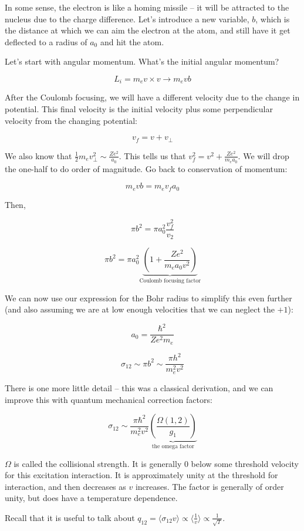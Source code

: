 \documentclass{article}
\def\sigot{\sigma_{12}}
\def\sigot{\sigma_{12}}
\begin{document}
In some sense, the electron is like a homing missile -- it will be attracted to the nucleus due to the charge difference. Let's introduce a new variable, $b$, which is the distance at which we can aim the electron at the atom, and still have it get deflected to a radius of $a_0$ and hit the atom. 

Let's start with angular momentum. What's the initial angular momentum? 

$$
L_i = m_e v\times v \rightarrow m_e  v b
$$

After the Coulomb focusing, we will have a different velocity due to the change in potential. This final velocity is the initial velocity plus some perpendicular velocity from the changing potential:

$$
v_f = v + v_\perp
$$

We also know that $\frac12 m_e v_\perp^2 \sim \frac{Ze^2}{a_0}$. This tells us that $v_f^2 = v^2 + \frac{Ze^2}{m_e a_0}$. We will drop the one-half to do order of magnitude. Go back to conservation of momentum:

$$
m_e v b = m_e v_f a_0 
$$

Then, 

$$
\pi b^2 = \pi a_0^2 \frac{v_f^2}{v_2}
$$

$$
\pi b^2 = \pi a_0^2 \underbrace{\left(1 + \frac{Z e^2}{m_e a_0 v^2}\right)}_\text{Coulomb focusing factor}
$$

We can now use our expression for the Bohr radius to simplify this even further (and also assuming we are at low enough velocities that we can neglect the $+1$):

$$
a_0 = \frac{\hbar^2}{Ze^2 m_e}
$$

$$
\sigot \sim \pi b^2 \sim \frac{\pi h^2}{m_e^2 v^2} 
$$

There is one more little detail -- this was a classical derivation, and we can improve this with quantum mechanical correction factors:

$$
\sigot \sim \frac{\pi \hbar^2}{m_e^2 v^2}\underbrace{\left(\frac{\Omega(1,2)}{g_1}\right)}_\text{the omega factor}
$$

$\Omega$ is called the collisional strength. It is generally 0 below some threshold velocity for this excitation interaction. It is approximately unity at the threshold for interaction, and then decreases as $v$ increases. The factor is generally of order unity, but does have a temperature dependence. 

Recall that it is useful to talk about $q_{12} = \langle \sigot v \rangle \propto \langle \frac{1}{v} \rangle \propto \frac{1}{\sqrt{T}}$. 
\end{document}
